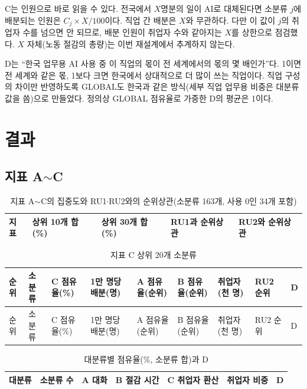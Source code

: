 \documentclass[11pt]{article}
\begin{document}
C는 인원으로 바로 읽을 수 있다. 전국에서 $X$명분의 일이 AI로 대체된다면 소분류 $j$에 배분되는 인원은 $C_j \times X / 100$이다. 직업 간 배분은 $X$와 무관하다. 다만 이 값이 $j$의 취업자 수를 넘으면 안 되므로, 배분 인원이 취업자 수와 같아지는 $X$를 상한으로 점검했다. $X$ 자체(노동 절감의 총량)는 이번 재설계에서 추계하지 않는다.

D는 ``한국 업무용 AI 사용 중 이 직업의 몫이 전 세계에서의 몫의 몇 배인가''다. 1이면 전 세계와 같은 몫, 1보다 크면 한국에서 상대적으로 더 많이 쓰는 직업이다. 직업 구성의 차이만 반영하도록 GLOBAL도 한국과 같은 방식(세부 직업 업무용 비중은 대분류 값을 씀)으로 만들었다. 정의상 GLOBAL 점유율로 가중한 D의 평균은 1이다.

\section{결과}

\subsection{지표 A$\sim$C}

\begin{longtable}{L{5.5cm}R{2.3cm}R{2.3cm}R{2.6cm}R{2.6cm}}
\caption{지표 A$\sim$C의 집중도와 RU1$\cdot$RU2와의 순위상관(소분류 163개, 사용 0인 34개 포함)}\label{tab:summary}\\
\toprule
지표 & 상위 10개 합(\%) & 상위 30개 합(\%) & RU1과 순위상관 & RU2와 순위상관 \\
\midrule
\endfirsthead

\bottomrule
\end{longtable}

\begin{longtable}{R{0.6cm}L{4.0cm}R{1.2cm}R{1.3cm}R{1.6cm}R{1.6cm}R{1.3cm}R{1.2cm}R{1.1cm}}
\caption{지표 C 상위 20개 소분류}\label{tab:top}\\
\toprule
순위 & 소분류 & C 점유율(\%) & 1만 명당 배분(명) & A 점유율(순위) & B 점유율(순위) & 취업자(천 명) & RU2 순위 & D \\
\midrule
\endfirsthead
\toprule
순위 & 소분류 & C 점유율(\%) & 1만 명당 배분(명) & A 점유율(순위) & B 점유율(순위) & 취업자(천 명) & RU2 순위 & D \\
\midrule
\endhead

\bottomrule
\end{longtable}

\begin{longtable}{L{5.2cm}R{1.6cm}R{1.8cm}R{1.8cm}R{1.8cm}R{1.8cm}R{1.4cm}}
\caption{대분류별 점유율(\%, 소분류 합)과 D}\label{tab:ksco1}\\
\toprule
대분류 & 소분류 수 & A 대화 & B 절감 시간 & C 취업자 환산 & 취업자 비중 & D \\
\midrule
\endfirsthead

\bottomrule
\end{longtable}
\end{document}
